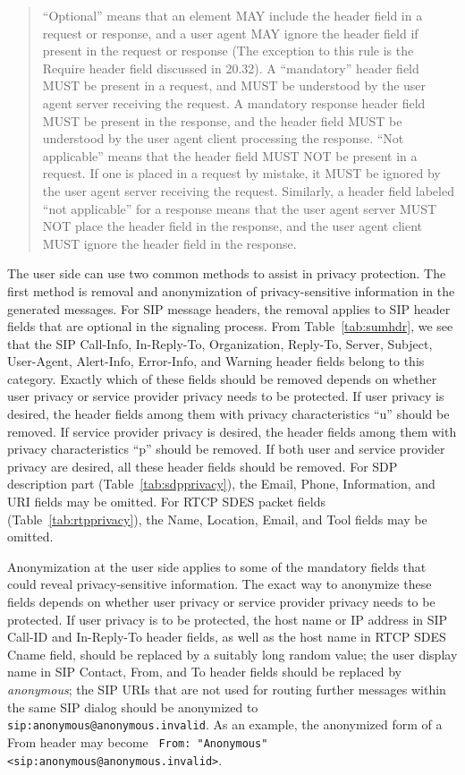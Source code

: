 \documentclass[letterpaper,notitlepage,times,12pt]{article}
\begin{document}
\begin{quote}
``Optional'' means that an element MAY include the header field in a request or response, and a user agent MAY ignore the header field if present in the request or response (The exception to this rule is the Require header field discussed in 20.32).  A ``mandatory'' header field MUST be present in a request, and MUST be understood by the user agent server receiving the request.  A mandatory response header field MUST be present in the response, and the header field MUST be understood by the user agent client processing the response.  ``Not applicable'' means that the header field MUST NOT be present in a request.  If one is placed in a request by mistake, it MUST be ignored by the user agent server receiving the request.  Similarly, a header field labeled ``not applicable'' for a response means that the user agent server MUST NOT place the header field in the response, and the user agent client MUST ignore the header field in the response.

\end{quote}

The user side can use two common methods to assist in privacy protection. The first method is removal and anonymization of privacy-sensitive information in the generated messages. For SIP message headers, the removal applies to SIP header fields that are optional in the signaling process. From Table~\ref{tab:sumhdr}, we see that the SIP {\sf Call-Info}, {\sf In-Reply-To}, {\sf Organization}, {\sf Reply-To}, {\sf Server}, {\sf Subject}, {\sf User-Agent}, {\sf Alert-Info}, {\sf Error-Info}, and {\sf Warning} header fields belong to this category. Exactly which of these fields should be removed depends on whether user privacy or service provider privacy needs to be protected. If user privacy is desired, the header fields among them with privacy characteristics ``u'' should be removed. If service provider privacy is desired, the header fields among them with privacy characteristics ``p'' should be removed. If both user and service provider privacy are desired, all these header fields should be removed. For SDP description part (Table~\ref{tab:sdpprivacy}), the {\sf Email}, {\sf Phone}, {\sf Information}, and {\sf URI} fields may be omitted. For RTCP SDES packet fields (Table~\ref{tab:rtpprivacy}), the {\sf Name}, {\sf Location}, {\sf Email}, and {\sf Tool} fields may be omitted.

Anonymization at the user side applies to some of the mandatory fields that could reveal privacy-sensitive information. The exact way to anonymize these fields depends on whether user privacy or service provider privacy needs to be protected. If user privacy is to be protected, the host name or IP address in SIP {\sf Call-ID} and {\sf In-Reply-To} header fields, as well as the host name in RTCP SDES {\sf Cname} field, should be replaced by a suitably long random value; the user display name in SIP {\sf Contact}, {\sf From}, and {\sf To} header fields should be replaced by {\it anonymous}; the SIP URIs that are not used for routing further messages within the same SIP dialog should be anonymized to \verb# sip:anonymous@anonymous.invalid#. As an example, the anonymized form of a {\sf From} header may become \verb# From: "Anonymous" <sip:anonymous@anonymous.invalid>#.
\end{document}
